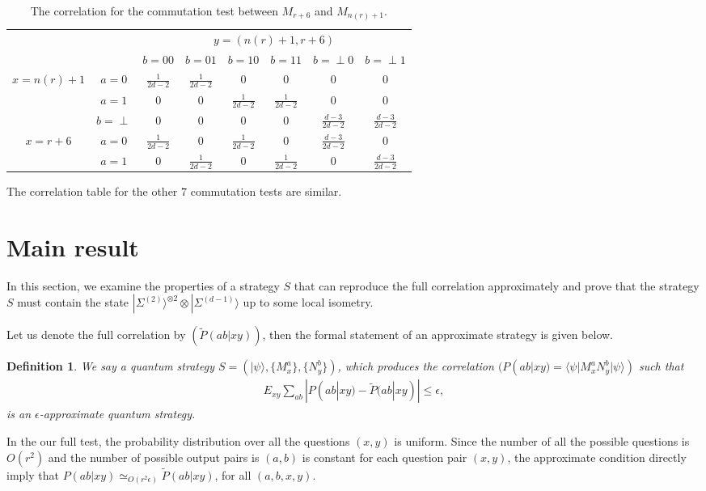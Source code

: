 \documentclass[11pt,letterpaper]{article}
\newcommand{\ket}[1]{|#1\rangle}
\newcommand{\bra}[1]{\langle#1|}
\newcommand{\x}{\otimes}
\newcommand{\1}{\mathbb{1}}
\newcommand{\EPR}[1]{\Sigma^{(#1)}}
\newcommand{\nr}{n(r)}
\newcommand{\pr}[2]{P(#1|#2)}
\newcommand{\tpr}[2]{\tilde{P}(#1|#2)}
\newcommand{\ep}{\epsilon}
\newcommand{\appd}[1]{\simeq_{#1}}
\newtheorem{definition}[theorem]{Definition}
\theoremstyle{definition}
\begin{document}
\begin{table}[H]
\begin{center}
\begin{tabular}{|c|c||c|c|c|c|c|c|}
\hline
\multicolumn{2}{|c|}{} &
\multicolumn{6}{|c|}{$y=(\nr+1, r+6)$}\\
\cline{3-8}
\multicolumn{2}{|c|}{} &
$b = 00$ & $b=01$ & 
$b = 10$ & $b=11$ &
$b = \perp0$ & $b= \perp1$   \\
\hline
\hline
\multirow{3}{*}{$x = \nr+1$} & $a=0$ & $\frac{1}{2d-2}$ & $\frac{1}{2d-2}$ &  $0$
& $0$ & $0$ & $0$  \\
\cline{2-8}
&$a=1$ & $0$ & $0 $ & $\frac{1}{2d-2}$ 
&  $\frac{1}{2d-2}$ & $0$ & $0$  \\
\cline{2-8}
&$b=\perp$ & 0 & 0 & $0$ 
&  0 & $\frac{d-3}{2d-2}$ & $\frac{d-3}{2d-2} $  \\
\hline
\multirow{2}{*}{$x = r+6$} & $a=0$ & $\frac{1}{2d-2}$ & $0$ & $\frac{1}{2d-2}$ 
& $0$ & $\frac{d-3}{2d-2}$ & 0  \\
\cline{2-8}
&$a=1$ & $0$ & $\frac{1}{2d-2}$ & $0$ 
&  $\frac{1}{2d-2}$ & $0$ & $\frac{d-3}{2d-2}$  \\
\hline
\end{tabular}
\end{center}
\caption{The correlation for the commutation test between $M_{r+6}$ and $M_{\nr+1}$.}
\label{tbl:comm}
\end{table}
The correlation table for the other $7$ commutation tests are similar.

\section{Main result}
\label{sec:main}
In this section, we examine the properties of a strategy $S$ that can reproduce the
full correlation approximately and 
prove that the strategy $S$ must contain the state $\ket{\EPR{2}}^{\x 2} \x \ket{\EPR{d-1}}$
up to some local isometry.

Let us denote the full correlation by $( \tpr{ab}{xy} )$, then the formal statement of an approximate strategy is given below.
\begin{definition}
	We say a quantum strategy $S = (\ket{\psi}, \{M_x^a\}, \{N_y^b\})$, which produces the correlation
	$( \pr{ab}{xy} = \bra{\psi} M_x^a N_y^b \ket{\psi} )$ such that
	\begin{align}
	E_{xy} \sum_{ab} |\pr{ab}{xy} - \tpr{ab}{xy}| \leq \ep,
	\end{align}
	is an $\ep$-approximate quantum strategy.
\end{definition}
In the our full test, the probability distribution over all the questions $(x,y)$ is uniform.
Since the number of all the possible questions is $O(r^2)$ and 
the number of possible output pairs is $(a,b)$ is constant for each question pair $(x,y)$, 
the approximate condition directly imply that 
$\pr{ab}{xy} \appd{O(r^2\ep)} \tpr{ab}{xy}$, for all $(a,b,x,y)$.
\end{document}
